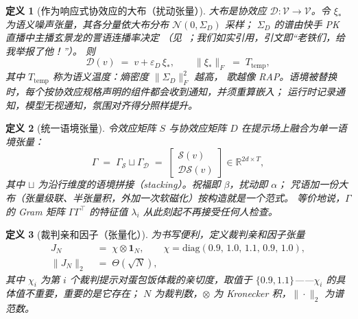 \documentclass[journal]{IEEEtran}
\newtheorem{definition}{定义}
\begin{document}
\begin{definition}[作为响应式协效应的大布（扰动张量）]
\emph{大布}是协效应 $\mathcal{D}:\mathcal{V}\to\mathcal{V}$。令
$\xi_{\ast}$ 为语义噪声张量，其各分量依\emph{大布分布} $\mathcal{N}(0,\Sigma_{D})$ 采样；
$\Sigma_D$ 的谱由快手 PK 直播中主播玄景龙的詈语连播率决定
（见~\cite{otomadwiki}；我们如实引用，引文即“老铁们，给我举报了他！”）。
则
\begin{equation}
\mathcal{D}(v)\;=\;v+\varepsilon_D\,\xi_{\ast},\qquad
\|\xi_{\ast}\|_{F}\;=\;T_{\mathrm{temp}},
\label{eq:dabuT}
\end{equation}
其中 $T_{\mathrm{temp}}$ 称为\emph{语义温度}：熵密度 $\|\Sigma_D\|_{F}^2$ 越高，
歌越像 RAP。语境被替换时，每个按协效应规格声明的组件都会收到通知，并须重算嵌入；
运行时记录通知，模型无视通知，氛围对齐得分照样提升。
\end{definition}

\begin{definition}[统一语境张量]
令效应矩阵 $S$ 与协效应矩阵 $D$ 在提示场上融合为单一语境张量：
\begin{equation}
\Gamma\;=\;\Gamma_{\mathcal{S}}\sqcup\Gamma_{\mathcal{D}}
\;=\;\begin{bmatrix}\mathcal{S}(v)\\ \mathcal{D}\mathcal{S}(v)\end{bmatrix}
\in\mathbb{R}^{2d\times T},
\label{eq:ctx}
\end{equation}
其中 $\sqcup$ 为沿行维度的语境拼接（stacking）。祝福即 $\beta$，扰动即 $\alpha$；
咒语加一份大布（张量级联、半张量积，外加一次软磁化）按构造就是一个范式。
等价地说，$\Gamma$ 的 Gram 矩阵
$\Gamma\Gamma^{\top}$ 的特征值 $\lambda_i$ 从此刻起不再接受任何人检查。
\end{definition}

\begin{definition}[裁判亲和因子（张量化）]
为书写便利，定义\emph{裁判亲和因子}张量
\begin{equation}
\begin{aligned}
J_N&\;=\;\chi\otimes\mathbf{1}_{\!N},\qquad
\chi=\mathrm{diag}(0.9,\,1.0,\,1.1,\,0.9,\,1.0),\\
\|J_N\|_2&\;=\;\Theta(\sqrt{N}),
\end{aligned}
\label{eq:amity}
\end{equation}
其中 $\chi_i$ 为第 $i$ 个裁判提示对蛋包饭体裁的\emph{亲切度}，取值于
$\{0.9,1.1\}$——$\chi_i$ 的具体值不重要，重要的是它\emph{存在}；
$N$ 为裁判数，$\otimes$ 为 Kronecker 积，$\|{\cdot}\|_2$ 为谱范数。
\end{definition}
\end{document}
